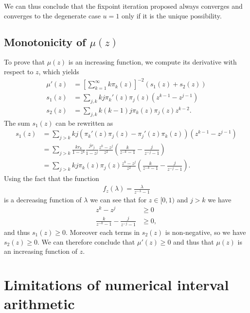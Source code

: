 \documentclass[
11pt, %
english, %
singlespacing, %
nolistspacing, %
liststotoc, %
headsepline, %
]{MastersDoctoralThesis} %
\begin{document}
We can thus conclude that the fixpoint iteration proposed always converges and converges to the degenerate case $u = 1$ only if it is the unique possibility.

\section{Monotonicity of $\mu(z)$}
\label{Appendix: Monotonicity}

To prove that $\mu(z)$ is an increasing function, we compute its derivative with respect to $z$, which yields
\begin{align}
	\mu'(z) &= \left[\sum_{k = 1}^{\infty}k \pi_k(z)\right]^{-2} \left(s_1(z) + s_2(z)\right) \\
	s_1(z) &= \sum_{j, k}k j \pi_k'(z) \pi_j(z) \left( z^{k-1} -  z^{j-1}\right) \\
	s_2(z) &= \sum_{j, k} k (k - 1) j \pi_k(z) \pi_j(z) z^{k-2}.
\end{align}
The sum $s_1(z)$ can be rewritten as
\begin{align}
	s_1(z) &= \sum_{j > k} k j \left(\pi_k'(z) \pi_j(z) - \pi_j'(z) \pi_k(z)\right) \left(z^{k-1} -  z^{j-1}\right) \\
		&=\sum_{j > k} \frac{k r_k}{1 - z^k} \frac{j r_j}{1 - z^j} \frac{z^k - z^j}{z^2} \left(\frac{k}{z^{-k} - 1} - \frac{j}{z^{-j} - 1}\right)\\
		&=\sum_{j > k} k j \pi_k(z) \pi_j(z) \frac{z^k - z^j}{z^2} \left(\frac{k}{z^{-k} - 1} - \frac{j}{z^{-j} - 1}\right).
\end{align}
Using the fact that the function
\begin{align}
	f_z(\lambda) = \frac{\lambda}{z^{-\lambda} - 1}
\end{align}
is a decreasing function of $\lambda$ we can see that for $z \in [0, 1)$ and $j > k$ we have
\begin{align}
	z^k - z^j &\geq 0 \\
	\frac{k}{z^{-k} - 1} - \frac{j}{z^{-j} - 1} &\geq 0,
\end{align}
and thus $s_1(z) \geq 0$. Moreover each terms in $s_2(z)$ is non-negative, so we have $s_2(z) \geq 0$. We can therefore conclude that $\mu'(z) \geq 0$ and thus that $\mu(z)$ is an increasing function of $z$.

\chapter{Limitations of numerical interval arithmetic}
\label{Appendix: Limitations of numerical interval arithmetic}
\end{document}
